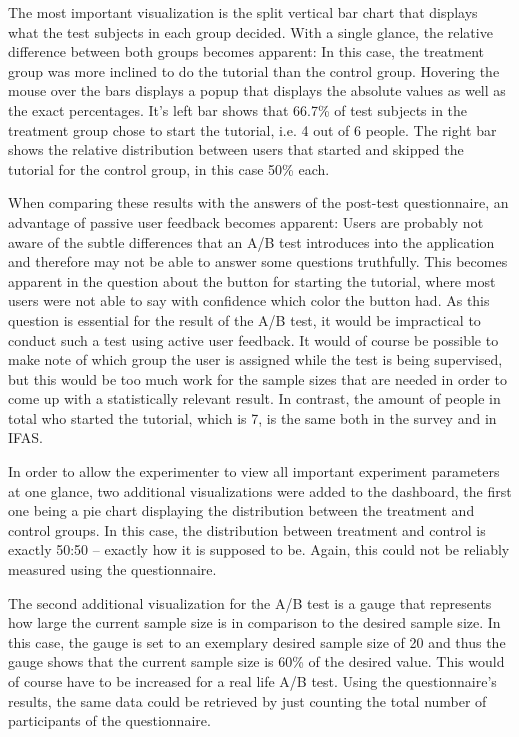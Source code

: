 The most important visualization is the split vertical bar chart that displays what the test subjects in each group decided.
With a single glance, the relative difference between both groups becomes apparent: In this case, the treatment group was more inclined to do the tutorial than the control group.
Hovering the mouse over the bars displays a popup that displays the absolute values as well as the exact percentages.
It's left bar shows that 66.7\% of test subjects in the treatment group chose to start the tutorial, i.e. 4 out of 6 people.
The right bar shows the relative distribution between users that started and skipped the tutorial for the control group, in this case 50\% each.

When comparing these results with the answers of the post-test questionnaire, an advantage of passive user feedback becomes apparent:
Users are probably not aware of the subtle differences that an A/B test introduces into the application and therefore may not be able to answer some questions truthfully.
This becomes apparent in the question about the button for starting the tutorial, where most users were not able to say with confidence which color the button had.
As this question is essential for the result of the A/B test, it would be impractical to conduct such a test using active user feedback.
It would of course be possible to make note of which group the user is assigned while the test is being supervised, but this would be too much work for the sample sizes that are needed in order to come up with a statistically relevant result.
In contrast, the amount of people in total who started the tutorial, which is 7, is the same both in the survey and in \ac{IFAS}.

In order to allow the experimenter to view all important experiment parameters at one glance, two additional visualizations were added to the dashboard, the first one being a pie chart displaying the distribution between the treatment and control groups.
In this case, the distribution between treatment and control is exactly 50:50 -- exactly how it is supposed to be.
Again, this could not be reliably measured using the questionnaire.

The second additional visualization for the A/B test is a gauge that represents how large the current sample size is in comparison to the desired sample size.
In this case, the gauge is set to an exemplary desired sample size of 20 and thus the gauge shows that the current sample size is 60\% of the desired value.
This would of course have to be increased for a real life A/B test.
Using the questionnaire's results, the same data could be retrieved by just counting the total number of participants of the questionnaire.



